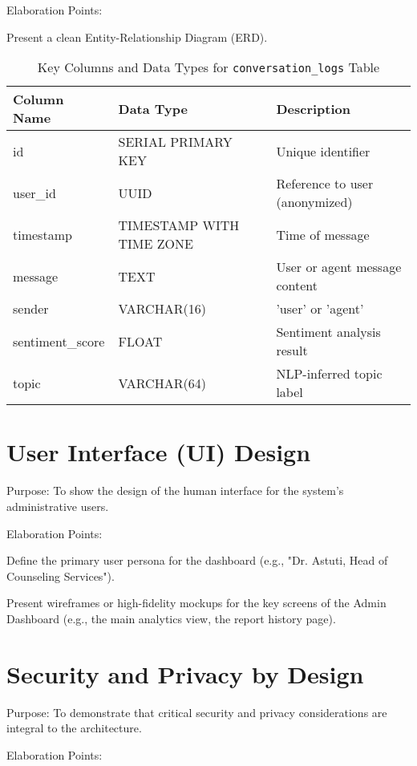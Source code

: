 Elaboration Points:

Present a clean Entity-Relationship Diagram (ERD).

\begin{table}[h]
    \centering
    \caption{Key Columns and Data Types for \texttt{conversation\_logs} Table}
    \label{tab:conversation-logs}
    \begin{tabular}{|l|l|l|}
        \hline
        \textbf{Column Name} & \textbf{Data Type} & \textbf{Description} \\
        \hline
        id & SERIAL PRIMARY KEY & Unique identifier \\
        user\_id & UUID & Reference to user (anonymized) \\
        timestamp & TIMESTAMP WITH TIME ZONE & Time of message \\
        message & TEXT & User or agent message content \\
        sender & VARCHAR(16) & 'user' or 'agent' \\
        sentiment\_score & FLOAT & Sentiment analysis result \\
        topic & VARCHAR(64) & NLP-inferred topic label \\
        \hline
    \end{tabular}
\end{table}

\section{User Interface (UI) Design}
Purpose: To show the design of the human interface for the system's administrative users.

Elaboration Points:

Define the primary user persona for the dashboard (e.g., "Dr. Astuti, Head of Counseling Services").

Present wireframes or high-fidelity mockups for the key screens of the Admin Dashboard (e.g., the main analytics view, the report history page).

\section{Security and Privacy by Design}
Purpose: To demonstrate that critical security and privacy considerations are integral to the architecture.

Elaboration Points:

